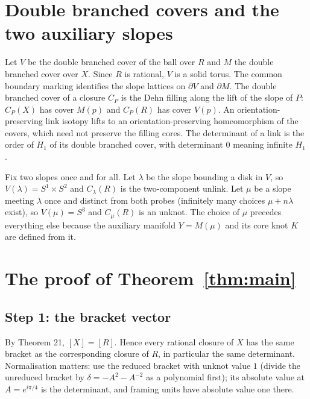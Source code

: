 \documentclass[11pt]{amsart}
\theoremstyle{remark}
\begin{document}
\section{Double branched covers and the two auxiliary slopes}

Let $V$ be the double branched cover of the ball over $R$ and $M$ the double branched cover over $X$. Since $R$ is rational, $V$ is a solid torus. The common boundary marking identifies the slope lattices on $\partial V$ and $\partial M$. The double branched cover of a closure $C_P$ is the Dehn filling along the lift of the slope of $P$: $C_P(X)$ has cover $M(p)$ and $C_P(R)$ has cover $V(p)$. An orientation-preserving link isotopy lifts to an orientation-preserving homeomorphism of the covers, which need not preserve the filling cores. The determinant of a link is the order of $H_1$ of its double branched cover, with determinant $0$ meaning infinite $H_1$ \cite{DFKLS}.

Fix two slopes once and for all. Let $\lambda$ be the slope bounding a disk in $V$, so $V(\lambda)=S^1\times S^2$ and $C_\lambda(R)$ is the two-component unlink. Let $\mu$ be a slope meeting $\lambda$ once and distinct from both probes (infinitely many choices $\mu+n\lambda$ exist), so $V(\mu)=S^3$ and $C_\mu(R)$ is an unknot. The choice of $\mu$ precedes everything else because the auxiliary manifold $Y=M(\mu)$ and its core knot $K$ are defined from it.

\section{The proof of Theorem~\ref{thm:main}}

\subsection*{Step 1: the bracket vector}
By Theorem 21, $[X]=[R]$. Hence every rational closure of $X$ has the same bracket as the corresponding closure of $R$, in particular the same determinant. Normalisation matters: use the reduced bracket with unknot value $1$ (divide the unreduced bracket by $\delta=-A^2-A^{-2}$ as a polynomial first); its absolute value at $A=e^{i\pi/4}$ is the determinant, and framing units have absolute value one there.
\end{document}
